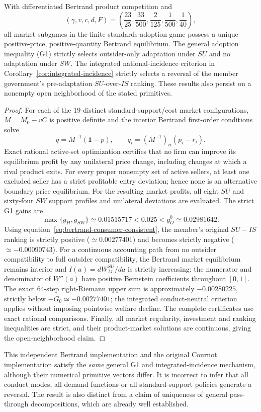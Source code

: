 \begin{proposition}
\label{prop:bertrand-R16}
With differentiated Bertrand product competition and
\[
 (\gamma,v,c,d,F)
 =\left(\frac{23}{25},\frac{33}{500},
 \frac{2}{125},\frac1{500},\frac1{40}\right),
\]
all market subgames in the finite standards-adoption game
possess a unique positive-price, positive-quantity Bertrand
equilibrium. The general adoption inequality (G1) strictly
selects outsider-only adaptation under \(SU\) and no adaptation
under \(SW\). The integrated national-incidence criterion
in Corollary~\ref{cor:integrated-incidence} strictly selects
a reversal of the member government's pre-adaptation
\(SU\)-over-\(IS\) ranking. These results also persist on
a nonempty open neighborhood of the stated primitives.
\end{proposition}
\begin{proof}
For each of the 19 distinct standard-support/cost
market configurations, \(M=M_0-vC\) is positive definite and
the interior Bertrand first-order conditions solve
\[
 q=M^{-1}(\boldsymbol1-p),\qquad
 q_i=(M^{-1})_{ii}(p_i-r_i).
\]
Exact rational active-set optimization certifies that no
firm can improve its equilibrium profit by any unilateral
price change, including changes at which a rival product
exits. For every proper nonempty set of active sellers,
at least one excluded seller has a strict profitable
entry deviation; hence none is an alternative boundary
price equilibrium. For the resulting market profits,
all eight \(SU\) and sixty-four \(SW\) support profiles
and unilateral deviations are evaluated. The strict
G1 gains are
\[
 \max\{\overline g_H,\overline g_{SW}\}
 \simeq0.01515717<0.025<g_O^0\simeq0.02981642.
\]
Using equation~\eqref{eq:bertrand-consumer-consistent},
the member's original \(SU-IS\) ranking is strictly
positive (\(\simeq0.00277401\)) and becomes strictly
negative (\(\simeq-0.00090743\)).
For a continuous accounting path from no outsider
compatibility to full outsider compatibility, the
Bertrand market equilibrium remains interior and
\(I(a)=dW_M^{SU}/da\) is strictly increasing:
the numerator and denominator of \(W''(a)\) have
positive Bernstein coefficients throughout \([0,1]\).
The exact \(64\)-step right-Riemann upper sum is
approximately \(-0.00280225\), strictly below
\(-G_0\simeq-0.00277401\); the integrated
conduct-neutral criterion applies without imposing
pointwise welfare decline. The complete certificates
use exact rational comparisons. Finally, all market
regularity, investment and ranking inequalities
are strict, and their product-market solutions are
continuous, giving the open-neighborhood claim.
\end{proof}

This independent Bertrand implementation and the
original Cournot implementation satisfy the
\emph{same} general G1 and integrated-incidence
mechanism, although their numerical primitive vectors
differ. It is incorrect to infer that all conduct modes,
all demand functions or all standard-support policies
generate a reversal. The result is also distinct from
a claim of uniqueness of general pass-through
decompositions, which are already well established.
